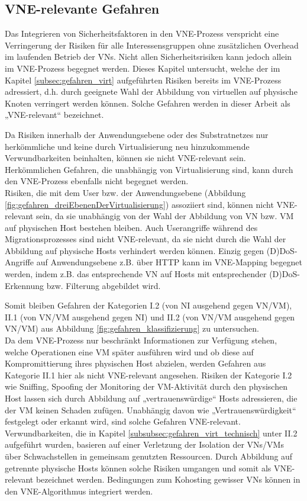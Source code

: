 \documentclass{lni}
\begin{document}




\subsection{VNE-relevante Gefahren}
\label{subsec:gefahren_vnerelevant}	
Das Integrieren von Sicherheitsfaktoren in den VNE-Prozess verspricht eine Verringerung der Risiken für alle Interessensgruppen ohne zusätzlichen Overhead im laufenden Betrieb der VNs. Nicht allen Sicherheitsrisiken kann jedoch allein im VNE-Prozess begegnet werden.\cite{fischer2013virtual, wang2016towards} 
Dieses Kapitel untersucht, welche der im Kapitel \ref{subsec:gefahren_virt} aufgeführten Risiken bereits im VNE-Prozess adressiert, d.h. durch geeignete Wahl der Abbildung von virtuellen auf physische Knoten verringert werden können. Solche Gefahren werden in dieser Arbeit als „VNE-relevant“ bezeichnet. 

Da Risiken innerhalb der Anwendungsebene oder des Substratnetzes nur herkömmliche und keine durch Virtualisierung neu hinzukommende Verwundbarkeiten beinhalten, können sie nicht VNE-relevant sein. Herkömmlichen Gefahren, die unabhängig von Virtualisierung sind, kann durch den VNE-Prozess ebenfalls nicht begegnet werden.\\
Risiken, die mit dem User bzw. der Anwendungsebene (Abbildung \ref{fig:gefahren_dreiEbenenDerVirtualisierung}) assoziiert sind, können nicht VNE-relevant sein, da sie unabhängig von der Wahl der Abbildung von VN bzw. VM auf physischen Host bestehen bleiben. Auch Userangriffe während des Migrationsprozesses sind nicht VNE-relevant, da sie nicht durch die Wahl der Abbildung auf physische Hosts verhindert werden können. Einzig gegen (D)DoS-Angriffe auf Anwendungsebene z.B. über HTTP kann im VNE-Mapping begegnet werden, indem z.B. das entsprechende VN auf Hosts mit entsprechender (D)DoS-Erkennung bzw. Filterung abgebildet wird.

Somit bleiben Gefahren der Kategorien I.2 (von NI ausgehend gegen VN/VM), II.1 (von VN/VM ausgehend gegen NI) und II.2 (von VN/VM ausgehend gegen VN/VM) aus Abbildung \ref{fig:gefahren_klassifizierung} zu untersuchen.\\
Da dem VNE-Prozess nur beschränkt Informationen zur Verfügung stehen, welche Operationen eine VM später ausführen wird und ob diese auf Kompromittierung ihres physischen Host abzielen, werden Gefahren aus Kategorie II.1 hier als nicht VNE-relevant angesehen. 
Risiken der Kategorie I.2 wie Sniffing, Spoofing der Monitoring der VM-Aktivität durch den physischen Host lassen sich durch Abbildung auf „vertrauenswürdige“ Hosts adressieren, die der VM keinen Schaden zufügen. Unabhängig davon wie „Vertrauenswürdigkeit“ festgelegt oder erkannt wird, sind solche Gefahren VNE-relevant.\\
Verwundbarkeiten, die in Kapitel \ref{subsubsec:gefahren_virt_technisch} unter II.2 aufgeführt wurden, basieren auf einer Verletzung der Isolation der VNs/VMs über Schwachstellen in gemeinsam genutzten Ressourcen. Durch Abbildung auf getrennte physische Hosts können solche Risiken umgangen und somit als VNE-relevant bezeichnet werden. Bedingungen zum Kohosting gewisser VNs können in den VNE-Algorithmus integriert werden. 
\end{document}
